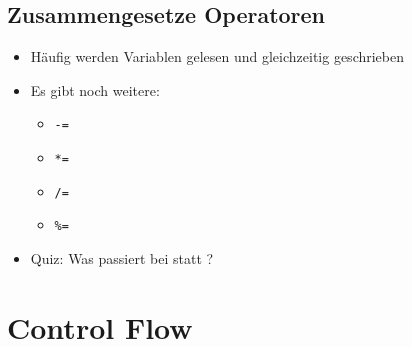 \subsection{Zusammengesetze Operatoren}
\begin{frame}[fragile]
    \slidehead

    \begin{itemize}
        \item Häufig werden Variablen gelesen und gleichzeitig geschrieben
    \end{itemize}


    \begin{itemize}
        \item Es gibt noch weitere:
            \begin{itemize}
                \item \verb+-=+
                \item \verb+*=+
                \item \verb+/=+
                \item \verb+%=+
            \end{itemize}
            \pause
        \item Quiz: Was passiert bei  statt ?
    \end{itemize}
\end{frame}

\livecoding


\section{Control Flow}
